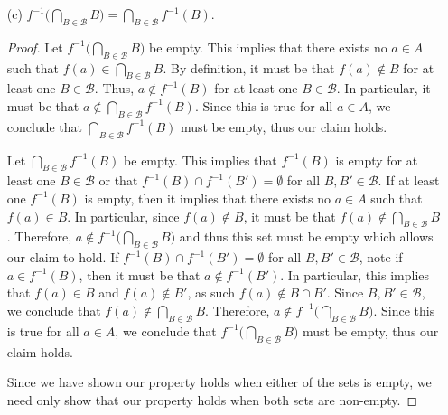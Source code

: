 \documentclass[12pt]{article}
\begin{document}
\begin{enumerate}
\begin{proof}
		Let $a \in \bigcup_{B \in \mathcal{B}} f^{-1}(B)$. This implies that 
		${a \in f^{-1}(B)}$ for at least one $B \in \mathcal{B}$. Therefore,
		$f(a) \in B$ for at least one $B \in \mathcal{B}$. In particular, 
		$f(a) \in \bigcup_{B \in \mathcal{B}} B$. Thus, we can conclude that
		$a \in f^{-1}\big(\bigcup_{B \in \mathcal{B}} B\big)$. Hence,
		$\bigcup_{B \in \mathcal{B}} f^{-1}(B) = f^{-1}\big(\bigcup_{B \in \mathcal{B}} B\big)$.
	\end{proof}
	\item[(c)] $f^{-1} \big(\bigcap_{B \in \mathcal{B}} B\big) = 
	\bigcap_{B \in \mathcal{B}} f^{-1}(B)$.
	\begin{proof}
		Let $f^{-1}\big(\bigcap_{B \in \mathcal{B}} B\big)$ be empty. This implies
		that there exists no $a \in A$ such that $f(a) \in \bigcap_{B \in \mathcal{B}} B$.
		By definition, it must be that $f(a) \notin B$ for at least one ${B \in \mathcal{B}}$.
		Thus, $a \notin f^{-1}(B)$ for at least one $B \in \mathcal{B}$. In particular, 
		it must be that $a \notin \bigcap_{B \in \mathcal{B}} f^{-1}(B)$. Since this is 
		true for all $a \in A$, we conclude that $\bigcap_{B \in \mathcal{B}} f^{-1}(B)$
		must be empty, thus our claim holds.
		
		Let $\bigcap_{B \in \mathcal{B}} f^{-1}(B)$ be empty. This implies that
		$f^{-1}(B)$ is empty for at least one $B \in \mathcal{B}$ or that 
		$f^{-1}(B) \cap f^{-1}(B') = \emptyset$ for all $B, B' \in \mathcal{B}$.
		If at least one $f^{-1}(B)$ is empty, then it implies that there exists no
		$a \in A$ such that $f(a) \in B$. In particular, since $f(a) \notin B$,
		it must be that $f(a) \notin \bigcap_{B \in \mathcal{B}} B$. Therefore,
		$a \notin f^{-1}\big(\bigcap_{B \in \mathcal{B}} B\big)$ and thus this set must
		be empty which allows our claim to hold. If $f^{-1}(B) \cap f^{-1}(B') = \emptyset$ 
		for all $B, B' \in \mathcal{B}$, note if $a \in f^{-1}(B)$, then it must be
		that $a \notin f^{-1}(B')$. In particular, this implies that 
		$f(a) \in B$ and $f(a) \notin B'$, as such $f(a) \notin B \cap B'$.
		Since $B, B' \in \mathcal{B}$, we conclude that 
		$f(a) \notin \bigcap_{B \in \mathcal{B}} B$. Therefore,
		$a \notin f^{-1}\big(\bigcap_{B \in \mathcal{B}} B\big)$. Since this is true
		for all $a \in A$, we conclude that $f^{-1}\big(\bigcap_{B \in \mathcal{B}} B\big)$
		must be empty, thus our claim holds.
		
		Since we have shown our property holds when either of the sets is empty, we need
		only show that our property holds when both sets are non-empty.
		

\end{proof}
\end{enumerate}
\end{document}
